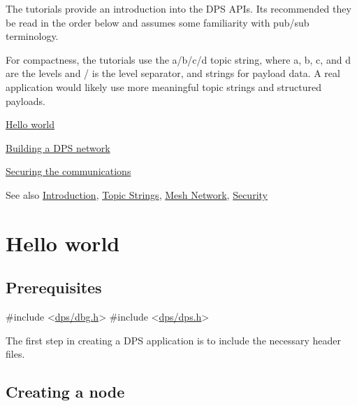 The tutorials provide an introduction into the D\+PS A\+P\+Is. It\textquotesingle{}s recommended they be read in the order below and assumes some familiarity with pub/sub terminology.

For compactness, the tutorials use the {\ttfamily a/b/c/d} topic string, where {\ttfamily a}, {\ttfamily b}, {\ttfamily c}, and {\ttfamily d} are the levels and {\ttfamily /} is the level separator, and strings for payload data. A real application would likely use more meaningful topic strings and structured payloads.


\begin{DoxyItemize}
\item \hyperlink{tutorials-hello-world}{Hello world}
\item \hyperlink{tutorials-link}{Building a D\+PS network}
\item \hyperlink{tutorials-security}{Securing the communications}
\end{DoxyItemize}

\begin{DoxySeeAlso}{See also}
\hyperlink{index}{Introduction}, \hyperlink{topic-strings}{Topic Strings}, \hyperlink{mesh-network}{Mesh Network}, \hyperlink{security}{Security} 
\end{DoxySeeAlso}
\hypertarget{tutorials-hello-world}{}\section{Hello world}\label{tutorials-hello-world}
\hypertarget{tutorials-hello-world_hello-world-prerequisites}{}\subsection{Prerequisites}\label{tutorials-hello-world_hello-world-prerequisites}

\begin{DoxyCodeInclude}
\textcolor{preprocessor}{#include <\hyperlink{dbg_8h}{dps/dbg.h}>}
\textcolor{preprocessor}{#include <\hyperlink{dps_8h}{dps/dps.h}>}
\end{DoxyCodeInclude}
 The first step in creating a D\+PS application is to include the necessary header files.\hypertarget{tutorials-hello-world_creating-a-node}{}\subsection{Creating a node}\label{tutorials-hello-world_creating-a-node}

